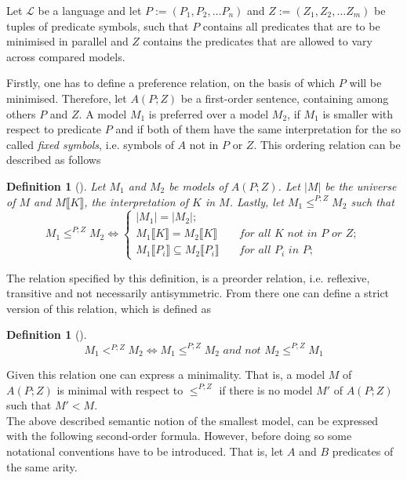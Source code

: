 \documentclass{article}
\newtheorem{mydef}[thm]{Definition}
\begin{document}
Let $\mathcal{L}$ be a language and let $P:=(P_1,P_2,\dots P_n)$ and $Z:=(Z_1,Z_2,\dots Z_m)$ be tuples of predicate symbols, such that $P$ contains all predicates that are to be minimised in parallel and $Z$ contains the predicates that are allowed to vary across compared models. 

Firstly, one has to define a preference relation, on the basis of which $P$ will be minimised. Therefore, let $A(P;Z)$ be a first-order sentence, containing among others $P$ and $Z$. A model $M_1$ is preferred over a model $M_2$, if $M_1$ is smaller with respect to predicate $P$ and if both of them have the same interpretation for the so called \emph{fixed symbols}, i.e. symbols of $A$ not in $P$ or $Z$. This ordering relation can be described as follows


 \begin{mydef}[\cite{brewka1997nonmonotonic}]
Let $M_1$ and $M_2$ be models of $A(P;Z)$. Let $|M|$ be the universe of $M$ and $M\llbracket K \rrbracket$, the interpretation of $K$ in $M$. Lastly, let $M_1 \leq^{P;Z} M_2$ such that
\begin{equation*}
M_1 \leq^{P;Z} M_2 \iff 
\begin{cases}
|M_1|=|M_2|; &\\
M_1\llbracket K \rrbracket = M_2\llbracket K \rrbracket  &\quad \textit{for all } K \textit{ not in } P \textit{ or } Z; \\
M_1\llbracket P_i \rrbracket \subseteq M_2\llbracket P_i \rrbracket  &\quad \textit{for all } P_i \textit{ in } P;
\end{cases}
\end{equation*}
\end{mydef} 
The relation specified by this definition, is a preorder relation, i.e. reflexive, transitive and not necessarily antisymmetric. From there one can define a strict version of this relation, which is defined as
\begin{mydef}[\cite{brewka1997nonmonotonic}]
\begin{equation*}
M_1 <^{P;Z} M_2 \iff  M_1 \leq^{P;Z} M_2  \textit{ and not } M_2 \leq^{P;Z} M_1
\end{equation*}
\end{mydef} 
Given this relation one can express a minimality. That is, a model $M$ of $A(P;Z)$ is minimal with respect to $\leq^{P;Z}$ if there is no model $M'$ of $A(P;Z)$ such that $M'<M$. \cite{brewka1997nonmonotonic, lifschitz1996circumscription}\\
 
The above described semantic notion of the smallest model, can be expressed with the following second-order formula. However, before doing so some notational conventions have to be introduced. That is, let $A$ and $B$ predicates of the same arity. 
\end{document}
